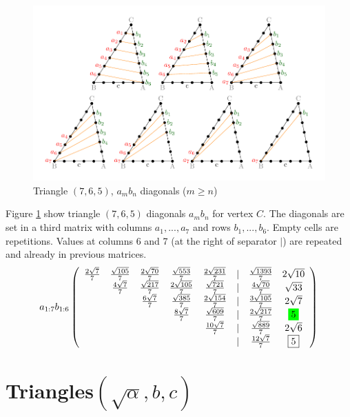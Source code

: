 \documentclass[11pt]{article}
\begin{document}
\begin{figure}[htp]
\centering
\includegraphics[scale=1]{t765ab}
\caption{Triangle $(7,6,5)$, $a_mb_n$ diagonals ($m \ge n$)}
\label{t765ab}
\end{figure}
Figure \ref{t765ab} show triangle $(7,6,5)$ diagonals $a_mb_n$ for vertex $C$.
The diagonals are set in a third matrix with columns $a_1,...,a_7$ and rows $b_1,...,b_6$. Empty cells are repetitions.
Values at columns 6 and 7 (at the right of separator $|$) are repeated and already in previous matrices.
\begin{equation}\label{eq:appendrow}
a_{1:7}b_{1:6}\left(\begin{array}{cccccccc}
	\frac{2\sqrt7}7 & \frac{\sqrt{105}}7 & \frac{2\sqrt{70}}7 & \frac{\sqrt{553}}7 & \frac{2\sqrt{231}}7 & | &  \frac{\sqrt{1393}}7 & 2\sqrt{10} \\
	 & \frac{4\sqrt7}7 & \frac{\sqrt{217}}7 & \frac{2\sqrt{105}}7 & \frac{\sqrt{721}}7 & | &  \frac{4\sqrt{70}}7 & \sqrt{33} \\
	 & & \frac{6\sqrt7}7 & \frac{\sqrt{385}}7 & \frac{2\sqrt{154}}7 & | &  \frac{3\sqrt{105}}7 & 2\sqrt{7} \\
	 & & & \frac{8\sqrt7}7 & \frac{\sqrt{609}}7 & | &  \frac{2\sqrt{217}}7 & \five \\
	 & & & & \frac{10\sqrt7}7 & | &  \frac{\sqrt{889}}7 & 2\sqrt{6} \\
	 & & & & & | & \frac{12\sqrt7}7 & \boxed{5} \\
\end{array}\right)
\end{equation}

\section{Triangles$(\sqrt{\alpha},b,c)$}
\end{document}
